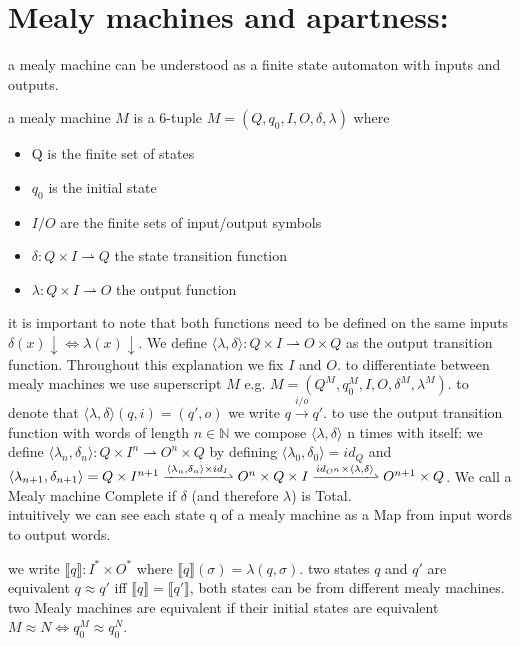 \section{Mealy machines and apartness:}
a mealy machine can be understood as a finite state automaton with inputs and outputs. 
\begin{definition}
	 a mealy machine $M$ is a 6-tuple $M=(Q,q_0,I,O,\delta,\lambda)$  where 
\begin{itemize}[itemsep=-8pt, topsep=-20pt]
	\item Q is the finite set of states 
	\item $q_0$ is the initial state 
	\item $I/O$ are the finite sets of input/output symbols
	\item $\delta :Q\times I\rightharpoonup Q$ the state transition function 
	\item $\lambda :Q\times I\rightharpoonup O$ the output function 
\end{itemize}
\end{definition}
it is important to note that both functions need to be defined on the same inputs $\delta(x)\downarrow\iff\lambda(x)\downarrow$. We define $\langle\lambda,\delta\rangle:Q\times I\rightharpoonup O\times Q$ as the output transition function. 
Throughout this explanation we fix $I$ and $O$.  to differentiate between mealy machines we use superscript $M$ e.g. $M=(Q^M,q_0^M,I,O,\delta^M,\lambda^M)$.  to denote that $\langle\lambda,\delta\rangle(q,i)=(q',o)$ we write $q\xrightarrow{i/o}q'$. to use the output transition function with words of length $n\in\mathbb{N}$ we compose $\langle\lambda,\delta\rangle$ n  times with itself: we define $\langle\lambda_n,\delta_n\rangle:Q\times I^n\rightharpoonup O^n\times Q$ by defining $\langle\lambda_0,\delta_0\rangle=id_Q$ and $\langle\lambda_{n+1},\delta_{n+1}\rangle =Q\times I^{n+1}\xrightharpoonup{\langle\lambda_n,\delta_n\rangle\times id_I}O^n\times Q\times I\xrightharpoonup{id_{O^n}\times\langle\lambda,\delta\rangle} O^{n+1}\times Q$. We call a Mealy machine Complete if $\delta$ (and therefore $\lambda$) is Total. \\
intuitively we can see each state q of a mealy machine as a Map  from input words to output words. 
\begin{definition}
	 we write $\llbracket q\rrbracket:I^*\times O^*$ where $\llbracket q\rrbracket(\sigma)=\lambda(q,\sigma)$. two states $q$ and $q'$ are equivalent $q\approx q'$ iff $\llbracket q\rrbracket=\llbracket q' \rrbracket$, both states can be from different mealy machines. two Mealy machines are equivalent if their initial states are equivalent $M\approx N\iff q_0^M\approx q_0^N$.
\end{definition}
